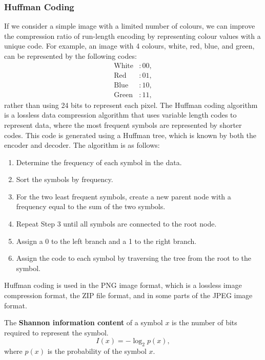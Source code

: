 \documentclass{article}
\begin{document}
\subsubsection{Huffman Coding}
If we consider a simple image with a limited number of colours, we can
improve the compression ratio of run-length encoding by representing
colour values with a unique code. For example, an image with 4 colours,
white, red, blue, and green, can be represented by the following codes:
\begin{align*}
    \text{White} & : 00, \\
    \text{Red}   & : 01, \\
    \text{Blue}  & : 10, \\
    \text{Green} & : 11,
\end{align*}
rather than using 24 bits to represent each pixel. The Huffman coding
algorithm is a lossless data compression algorithm that uses variable
length codes to represent data, where the most frequent symbols are
represented by shorter codes. This code is generated using a Huffman
tree, which is known by both the encoder and decoder. The algorithm is
as follows:
\begin{enumerate}
    \item Determine the frequency of each symbol in the data.
    \item Sort the symbols by frequency.
    \item For the two least frequent symbols, create a new parent node
          with a frequency equal to the sum of the two symbols.
    \item Repeat Step 3 until all symbols are connected to the root
          node.
    \item Assign a 0 to the left branch and a 1 to the right branch.
    \item Assign the code to each symbol by traversing the tree from
          the root to the symbol.
\end{enumerate}
Huffman coding is used in the PNG image format, which is a lossless
image compression format, the ZIP file format, and in some parts of the
JPEG image format.
\begin{definition}
    The \textbf{Shannon information content} of a symbol \(x\) is the
    number of bits required to represent the symbol.
    \begin{equation*}
        I\left( x \right) = -\log_2{p\left( x \right)},
    \end{equation*}
    where \(p\left( x \right)\) is the probability of the symbol \(x\).
\end{definition}
\end{document}
